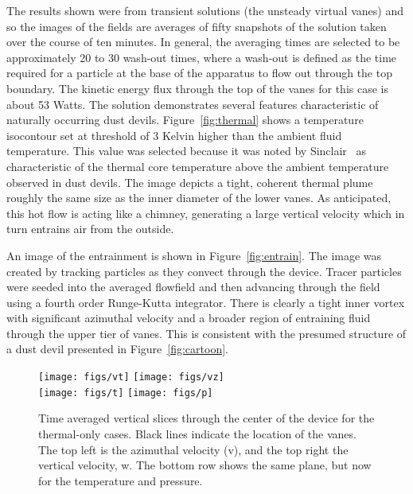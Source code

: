 The results shown were from transient solutions (the unsteady virtual
vanes) and so the images of the fields are averages of fifty snapshots
of the solution taken over the course of ten minutes. In general, the
averaging times are selected to be approximately 20 to 30 wash-out
times, where a wash-out is defined as the time required for a particle
at the base of the apparatus to flow out through the top boundary. The
kinetic energy flux through the top of the vanes for this case is about
53 Watts. The solution demonstrates several features characteristic of
naturally occurring dust devils. Figure~\ref{fig:thermal} shows a
temperature isocontour set at threshold of 3 Kelvin higher than the
ambient fluid temperature. This value was selected because it was noted
by Sinclair~\cite{Sinclair1969} as characteristic of the thermal core 
temperature above the ambient temperature observed in dust devils. The
image depicts a tight, coherent thermal plume roughly the same size as
the inner diameter of the lower vanes. As anticipated, this hot flow is
acting like a chimney, generating a large vertical velocity which in
turn entrains air from the outside.  

An image of the entrainment is shown in Figure~\ref{fig:entrain}. The
image was created by tracking particles as they convect through the
device. Tracer particles were seeded into the averaged flowfield and
then advancing through the field using a fourth order Runge-Kutta integrator.  
There is clearly a tight inner vortex with significant azimuthal
velocity and a broader region of entraining fluid through the upper tier
of vanes. This is consistent with the presumed structure of a dust devil
presented in Figure~\ref{fig:cartoon}.    

\begin{figure}[htb]

 \centering
 \texttt{[image: figs/vt]}
 \hfill
  \texttt{[image: figs/vz]}
 \\
  \centering
  \texttt{[image: figs/t]}
 \hfill
 \texttt{[image: figs/p]}
 \caption{Time averaged vertical slices through the center of the device
 for the thermal-only cases. Black lines indicate the location of the
 vanes. The top left is the azimuthal velocity (v), and the top right
 the vertical velocity, w. The bottom row shows the same plane, but now for the
 temperature and pressure.} 
 \label{fig:to-vert}
\end{figure}

